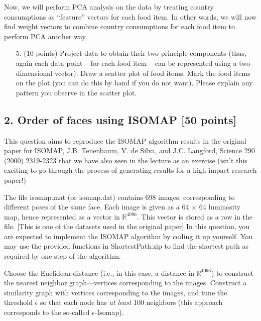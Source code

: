 \documentclass[twoside,12pt]{article}
\begin{document}
Now, we will perform PCA analysis on the data by treating country consumptions as ``feature'' vectors for each food item. In other words, we will now find weight vectors to combine country consumptions for each food item to perform PCA another way.
\begin{enumerate}
\item[5. ] (10 points) Project data to obtain their two principle components (thus, again each data point -- for each food item -- can be represented using a two-dimensional vector). Draw a scatter plot of food items. Mark the food items on the plot (you can do this by hand if you do not want). Please explain any pattern you observe in the scatter plot.
\end{enumerate}



\subsection*{2. Order of faces using ISOMAP [50 points]}

This question aims to reproduce the ISOMAP algorithm results in the original paper for ISOMAP, J.B. Tenenbaum, V. de Silva, and J.C. Langford, Science 290 (2000) 2319-2323 that we have also seen in the lecture as an exercise (isn't this exciting to go through the process of generating results for a high-impact research paper!) 


The file \textsf{isomap.mat} (or \textsf{isomap.dat}) contains 698 images, corresponding to different poses of the same face. Each image is given as a 64 $\times$ 64 luminosity map, hence represented as a vector in $\mathbb R^{4096}$. This vector is stored as a row in the file. [This is one of the datasets used in the original paper] In this question, you are expected to implement the ISOMAP algorithm by coding it up yourself. You may use the provided functions in \textsf{ShortestPath.zip} to find the shortest path as required by one step of the algorithm. 

Choose the Euclidean distance (i.e., in this case, a distance in $\mathbb R^{4096}$) to construct the nearest neighbor graph—vertices corresponding to the images. Construct a similarity graph with vertices corresponding to the images, and tune the threshold $\epsilon$ so that each node has {\it at least} 100 neighbors (this approach corresponds to the so-called $\epsilon$-Isomap).
\end{document}
